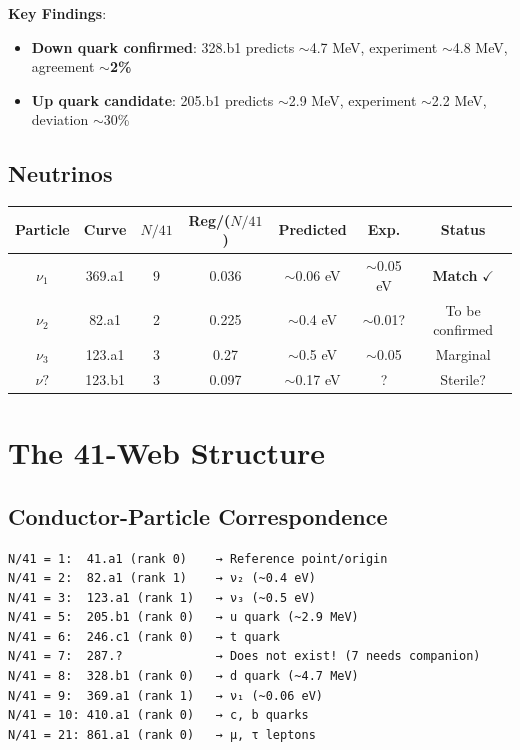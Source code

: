 ﻿\documentclass[11pt,a4paper]{article}
\begin{document}
\textbf{Key Findings}:
\begin{itemize}
    \item \textbf{Down quark confirmed}: 328.b1 predicts $\sim$4.7 MeV, experiment $\sim$4.8 MeV, agreement \textbf{$\sim$2\%}
    \item \textbf{Up quark candidate}: 205.b1 predicts $\sim$2.9 MeV, experiment $\sim$2.2 MeV, deviation $\sim$30\%
\end{itemize}

\subsection{Neutrinos}

\begin{table}[h]
\centering
\begin{tabular}{@{}ccccccc@{}}
\toprule
\textbf{Particle} & \textbf{Curve} & $N/41$ & Reg/($N/41$) & \textbf{Predicted} & \textbf{Exp.} & \textbf{Status} \\
\midrule
$\nu_1$ & 369.a1 & 9 & 0.036 & $\sim$0.06 eV & $\sim$0.05 eV & \textbf{Match} $\checkmark$ \\
$\nu_2$ & 82.a1 & 2 & 0.225 & $\sim$0.4 eV & $\sim$0.01? & To be confirmed \\
$\nu_3$ & 123.a1 & 3 & 0.27 & $\sim$0.5 eV & $\sim$0.05 & Marginal \\
$\nu?$ & 123.b1 & 3 & 0.097 & $\sim$0.17 eV & ? & Sterile? \\
\bottomrule
\end{tabular}
\end{table}

\section{The 41-Web Structure}

\subsection{Conductor-Particle Correspondence}

\begin{verbatim}
N/41 = 1:  41.a1 (rank 0)    → Reference point/origin
N/41 = 2:  82.a1 (rank 1)    → ν₂ (~0.4 eV)
N/41 = 3:  123.a1 (rank 1)   → ν₃ (~0.5 eV)
N/41 = 5:  205.b1 (rank 0)   → u quark (~2.9 MeV)
N/41 = 6:  246.c1 (rank 0)   → t quark
N/41 = 7:  287.?             → Does not exist! (7 needs companion)
N/41 = 8:  328.b1 (rank 0)   → d quark (~4.7 MeV)
N/41 = 9:  369.a1 (rank 1)   → ν₁ (~0.06 eV)
N/41 = 10: 410.a1 (rank 0)   → c, b quarks
N/41 = 21: 861.a1 (rank 0)   → μ, τ leptons
\end{verbatim}
\end{document}
